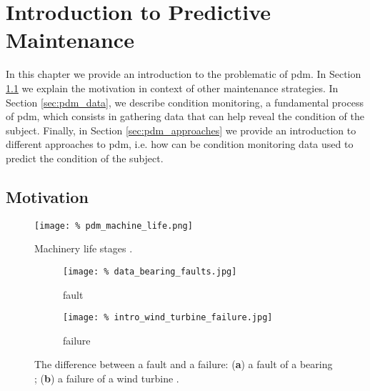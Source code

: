 \chapter{Introduction to Predictive Maintenance}
\label{chapter:pdm}

In this chapter we provide an introduction to the problematic of \acrshort{pdm}.
In Section \ref{sec:pdm_motivation} we explain the motivation in context of other maintenance strategies.
In Section \ref{sec:pdm_data}, we describe condition monitoring, a fundamental process of \acrshort{pdm}, which consists in gathering data that can help reveal the condition of the subject.
Finally, in Section \ref{sec:pdm_approaches} we provide an introduction to different approaches to \acrshort{pdm}, i.e. how can be condition monitoring data used to predict the condition of the subject.

\section{Motivation}
\label{sec:pdm_motivation}

\begin{figure}
    \centering
    \texttt{[image: \%
        pdm\_machine\_life.png]}
    \caption{Machinery life stages \cite{bilosova2012vibration}.}
    \label{fig:pdm_machine_life}
\end{figure}

\begin{figure}
    \centering
    \begin{subfigure}{.5\textwidth}
        \texttt{[image: \%
            data\_bearing\_faults.jpg]}
        \caption{fault}
    \end{subfigure}%
    \begin{subfigure}{.5\textwidth}
        \texttt{[image: \%
            intro\_wind\_turbine\_failure.jpg]}
        \caption{failure}
    \end{subfigure}
    \caption{The difference between a fault and a failure: (\textbf{a}) a fault of a bearing \cite{lei2018machinery};
             (\textbf{b}) a failure of a wind turbine \cite{wind_turbine_failure}.}
    \label{fig:intro_fault_failure}
\end{figure}

